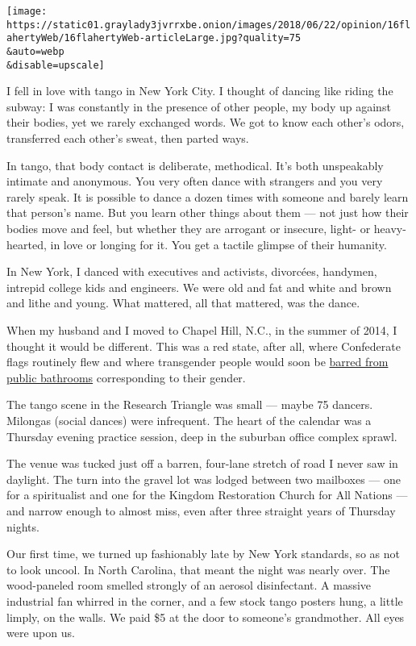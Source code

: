 \texttt{[image: https://static01.graylady3jvrrxbe.onion/images/2018/06/22/opinion/16flahertyWeb/16flahertyWeb-articleLarge.jpg?quality=75\\\&auto=webp\\\&disable=upscale]}

I fell in love with tango in New York City. I thought of dancing like
riding the subway: I was constantly in the presence of other people, my
body up against their bodies, yet we rarely exchanged words. We got to
know each other's odors, transferred each other's sweat, then parted
ways.

In tango, that body contact is deliberate, methodical. It's both
unspeakably intimate and anonymous. You very often dance with strangers
and you very rarely speak. It is possible to dance a dozen times with
someone and barely learn that person's name. But you learn other things
about them --- not just how their bodies move and feel, but whether they
are arrogant or insecure, light- or heavy-hearted, in love or longing
for it. You get a tactile glimpse of their humanity.

In New York, I danced with executives and activists, divorcées,
handymen, intrepid college kids and engineers. We were old and fat and
white and brown and lithe and young. What mattered, all that mattered,
was the dance.

When my husband and I moved to Chapel Hill, N.C., in the summer of 2014,
I thought it would be different. This was a red state, after all, where
Confederate flags routinely flew and where transgender people would soon
be
\href{https://www.nytimes3xbfgragh.onion/2016/03/24/us/north-carolina-to-limit-bathroom-use-by-birth-gender.html}{barred
from public bathrooms} corresponding to their gender.

The tango scene in the Research Triangle was small --- maybe 75 dancers.
Milongas (social dances) were infrequent. The heart of the calendar was
a Thursday evening practice session, deep in the suburban office complex
sprawl.

The venue was tucked just off a barren, four-lane stretch of road I
never saw in daylight. The turn into the gravel lot was lodged between
two mailboxes --- one for a spiritualist and one for the Kingdom
Restoration Church for All Nations --- and narrow enough to almost miss,
even after three straight years of Thursday nights.

Our first time, we turned up fashionably late by New York standards, so
as not to look uncool. In North Carolina, that meant the night was
nearly over. The wood-paneled room smelled strongly of an aerosol
disinfectant. A massive industrial fan whirred in the corner, and a few
stock tango posters hung, a little limply, on the walls. We paid \$5 at
the door to someone's grandmother. All eyes were upon us.

